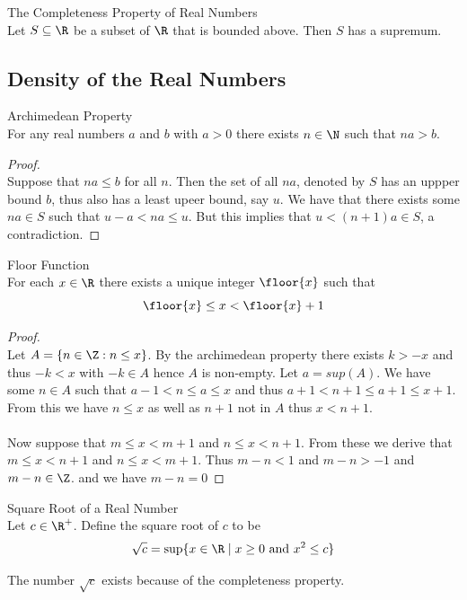 \documentclass[a4paper]{article}
\begin{document}
\begin{thm}{The Completeness Property of Real Numbers}{}\\ Let $S\subseteq\R$ be a subset of $\R$ that is bounded above. Then $S$ has a supremum. 
\end{thm}

\subsection{Density of the Real Numbers}
\begin{thm}{Archimedean Property}{}\\ For any real numbers $a$ and $b$ with $a>0$ there exists $n\in\N$ such that $na>b$. 
\begin{proof}\\ Suppose that $na\leq b$ for all $n$. Then the set of all $na$, denoted by $S$ has an uppper bound $b$, thus also has a least upeer bound, say $u$. We have that there exists some $na\in S$ such that $u-a<na\leq u$. But this implies that $u<(n+1)a\in S$, a contradiction. 
\end{proof}
\end{thm}

\begin{prp}{Floor Function}{}\\ For each $x\in\R$ there exists a unique integer $\floor{x}$ such that $$\floor{x}\leq x<\floor{x}+1$$ 
\begin{proof}\\ Let $A=\{n\in\Z:n\leq x\}$. By the archimedean property there exists $k>-x$ and thus $-k<x$ with $-k\in A$ hence $A$ is non-empty. Let $a=sup(A)$. We have some $n\in A$ such that $a-1<n\leq a\leq x$ and thus $a+1<n+1\leq a+1\leq x+1$. From this we have $n\leq x$ as well as $n+1$ not in $A$ thus $x<n+1$. \\~\\
Now suppose that $m\leq x<m+1$ and $n\leq x<n+1$. From these we derive that $m\leq x<n+1$ and $n\leq x<m+1$. Thus $m-n<1$ and $m-n>-1$ and $m-n\in\Z$. and we have $m-n=0$
\end{proof}
\end{prp}

\begin{defn}{Square Root of a Real Number}{}\\
Let $c\in\R^+$. Define the square root of $c$ to be $$\sqrt{c}=\sup\{x\in\R\;|\;x\geq 0\text{ and }x^2\leq c\}$$
\end{defn}

The number $\sqrt{c}$ exists because of the completeness property. 
\end{document}
